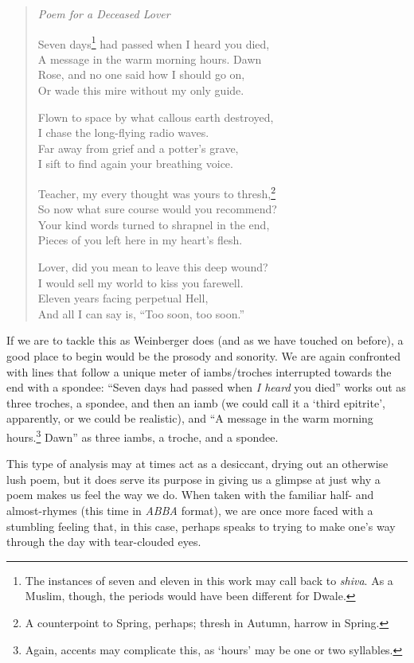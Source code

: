 \begin{verse}
\emph{Poem for a Deceased Lover}

Seven days\footnote{The instances of seven and eleven in this work may call back to \emph{shiva}. As a Muslim, though, the periods would have been different for Dwale.} had passed when I heard you died, \\
A message in the warm morning hours. Dawn \\
Rose, and no one said how I should go on, \\
Or wade this mire without my only guide.

Flown to space by what callous earth destroyed, \\
I chase the long-flying radio waves. \\
Far away from grief and a potter's grave, \\
I sift to find again your breathing voice.

Teacher, my every thought was yours to thresh,\footnote{A counterpoint to Spring, perhaps; thresh in Autumn, harrow in Spring.} \\
So now what sure course would you recommend? \\
Your kind words turned to shrapnel in the end, \\
Pieces of you left here in my heart's flesh.

Lover, did you mean to leave this deep wound? \\
I would sell my world to kiss you farewell. \\
Eleven years facing perpetual Hell, \\
And all I can say is, ``Too soon, too soon.''

\parencite[14]{leaves}
\end{verse}

If we are to tackle this as Weinberger does (and as we have touched on before), a good place to begin would be the prosody and sonority. We are again confronted with lines that follow a unique meter of iambs/troches interrupted towards the end with a spondee: ``Seven days had passed when \emph{I heard} you died'' works out as three troches, a spondee, and then an iamb (we could call it a `third epitrite', apparently, or we could be realistic), and ``A message in the warm morning hours.\footnote{Again, accents may complicate this, as `hours' may be one or two syllables.} Dawn'' as three iambs, a troche, and a spondee. 

This type of analysis may at times act as a desiccant, drying out an otherwise lush poem, but it does serve its purpose in giving us a glimpse at just why a poem makes us feel the way we do. When taken with the familiar half- and almost-rhymes (this time in \emph{ABBA} format), we are once more faced with a stumbling feeling that, in this case, perhaps speaks to trying to make one's way through the day with tear-clouded eyes.

